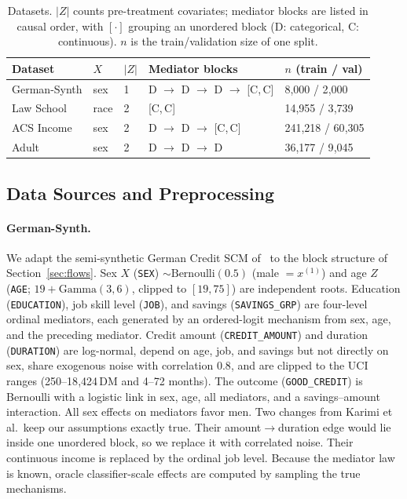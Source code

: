 \begin{table}[t]
\centering
\small
\caption{Datasets. $|Z|$ counts pre-treatment covariates; mediator blocks are
listed in causal order, with $[\cdot]$ grouping an unordered block
(D: categorical, C: continuous). $n$ is the train/validation size of one
split.}
\label{tab:datasets}
\begin{tabular}{lllll}
\hline
Dataset & $X$ & $|Z|$ & Mediator blocks & $n$ (train / val) \\
\hline
German-Synth & sex  & 1 & D $\to$ D $\to$ D $\to$ [C,\,C] & 8{,}000 / 2{,}000 \\
Law School   & race & 2 & [C,\,C]                         & 14{,}955 / 3{,}739 \\
ACS Income   & sex  & 2 & D $\to$ D $\to$ [C,\,C]         & 241{,}218 / 60{,}305 \\
Adult        & sex  & 2 & D $\to$ D $\to$ D               & 36{,}177 / 9{,}045 \\
\hline
\end{tabular}
\end{table}

\subsection{Data Sources and Preprocessing}
\label{app:data_sources}

\paragraph{German-Synth.}
We adapt the semi-synthetic German Credit SCM
of~\citet{karimi2020imperfect} to the block structure of
Section~\ref{sec:flows}. Sex $X$ (\texttt{SEX}) $\sim\mathrm{Bernoulli}(0.5)$
(male $=x^{(1)}$) and age $Z$ (\texttt{AGE}; $19+\mathrm{Gamma}(3,6)$, clipped
to $[19,75]$) are independent roots. Education (\texttt{EDUCATION}), job skill
level (\texttt{JOB}), and savings (\texttt{SAVINGS\_GRP}) are four-level
ordinal mediators, each generated by an ordered-logit mechanism from sex, age,
and the preceding mediator. Credit amount (\texttt{CREDIT\_AMOUNT}) and
duration (\texttt{DURATION}) are log-normal, depend on age, job, and savings
but not directly on sex, share exogenous noise with correlation $0.8$, and are
clipped to the UCI ranges (250--18{,}424\,DM and 4--72 months). The outcome
(\texttt{GOOD\_CREDIT}) is Bernoulli with a logistic link in sex, age, all
mediators, and a savings--amount interaction. All sex effects on mediators
favor men. Two changes from Karimi et al.\ keep our assumptions exactly
true. Their amount$\to$duration edge would lie inside one unordered block, so
we replace it with correlated noise. Their continuous income is replaced by
the ordinal job level. Because the mediator law is known, oracle
classifier-scale effects are computed by sampling the true mechanisms.

